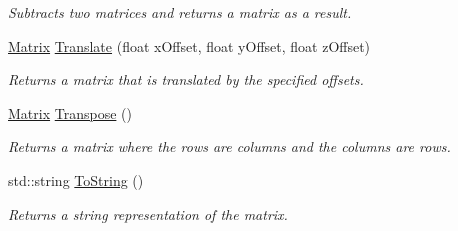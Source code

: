 \begin{DoxyCompactItemize}
\begin{DoxyCompactList}\small\item\em Subtracts two matrices and returns a matrix as a result. \end{DoxyCompactList}\item 
\hypertarget{struct_jade_1_1_math_1_1_matrix_aa1a013157118a87cd242d25e668aa3b6}{}\hyperlink{struct_jade_1_1_math_1_1_matrix}{Matrix} \hyperlink{struct_jade_1_1_math_1_1_matrix_aa1a013157118a87cd242d25e668aa3b6}{Translate} (float x\+Offset, float y\+Offset, float z\+Offset)\label{struct_jade_1_1_math_1_1_matrix_aa1a013157118a87cd242d25e668aa3b6}

\begin{DoxyCompactList}\small\item\em Returns a matrix that is translated by the specified offsets. \end{DoxyCompactList}\item 
\hypertarget{struct_jade_1_1_math_1_1_matrix_ac235e6add4163f779f1a3b007ee0f6d7}{}\hyperlink{struct_jade_1_1_math_1_1_matrix}{Matrix} \hyperlink{struct_jade_1_1_math_1_1_matrix_ac235e6add4163f779f1a3b007ee0f6d7}{Transpose} ()\label{struct_jade_1_1_math_1_1_matrix_ac235e6add4163f779f1a3b007ee0f6d7}

\begin{DoxyCompactList}\small\item\em Returns a matrix where the rows are columns and the columns are rows. \end{DoxyCompactList}\item 
\hypertarget{struct_jade_1_1_math_1_1_matrix_a913cad2a5906c10e1547ca26a1c3f18d}{}std\+::string \hyperlink{struct_jade_1_1_math_1_1_matrix_a913cad2a5906c10e1547ca26a1c3f18d}{To\+String} ()\label{struct_jade_1_1_math_1_1_matrix_a913cad2a5906c10e1547ca26a1c3f18d}

\begin{DoxyCompactList}\small\item\em Returns a string representation of the matrix. \end{DoxyCompactList}\end{DoxyCompactItemize}
